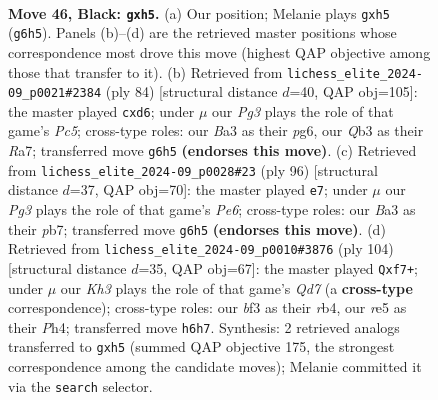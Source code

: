 \documentclass[11pt]{article}
\begin{document}
\clearpage

\begin{figure}[p]\centering
\begin{subfigure}{0.46\textwidth}\centering
\resizebox{\linewidth}{!}{%
\newchessgame
\chessboard[
  setfen={8/pp6/6pk/4R2P/5P2/bq3BK1/8/8 b - - 0 46},
  showmover=false,
  pgfstyle=straightmove, color=movearrow, markmove={g6-h5}
]}
\caption{}
\end{subfigure}\hfill
\begin{subfigure}{0.46\textwidth}\centering
\resizebox{\linewidth}{!}{%
\newchessgame
\chessboard[
  setfen={8/R3bk2/3pp1p1/2P3P1/7r/4Kp2/8/8 w - - 0 43},
  showmover=false,
  pgfstyle=straightmove, color=movearrow, markmove={c5-d6}
]}
\caption{}
\end{subfigure}
\\[4pt]
\begin{subfigure}{0.46\textwidth}\centering
\resizebox{\linewidth}{!}{%
\newchessgame
\chessboard[
  setfen={8/1pk2p1r/p1b1P3/8/5PP1/2Q3K1/1P6/8 w - - 0 49},
  showmover=false,
  pgfstyle=straightmove, color=movearrow, markmove={e6-e7}
]}
\caption{}
\end{subfigure}\hfill
\begin{subfigure}{0.46\textwidth}\centering
\resizebox{\linewidth}{!}{%
\newchessgame
\chessboard[
  setfen={8/1p1Q1pk1/4P1p1/8/1r3P1P/4K3/p7/8 w - - 0 53},
  showmover=false,
  pgfstyle=straightmove, color=movearrow, markmove={d7-f7}
]}
\caption{}
\end{subfigure}
\caption{\textbf{Move 46, Black: \texttt{gxh5}.} (a) Our position; Melanie plays \texttt{gxh5} (\texttt{g6h5}). Panels (b)--(d) are the retrieved master positions whose correspondence most drove this move (highest QAP objective among those that transfer to it). (b) Retrieved from \texttt{lichess\_elite\_2024-09\_p0021\#2384} (ply 84) [structural distance $d$=40, QAP obj=105]: the master played \texttt{cxd6}; under $\mu$ our \emph{Pg3} plays the role of that game's \emph{Pc5}; cross-type roles: our \emph{B}a3 as their \emph{p}g6, our \emph{Q}b3 as their \emph{R}a7; transferred move \texttt{g6h5} \textbf{(endorses this move)}. (c) Retrieved from \texttt{lichess\_elite\_2024-09\_p0028\#23} (ply 96) [structural distance $d$=37, QAP obj=70]: the master played \texttt{e7}; under $\mu$ our \emph{Pg3} plays the role of that game's \emph{Pe6}; cross-type roles: our \emph{B}a3 as their \emph{p}b7; transferred move \texttt{g6h5} \textbf{(endorses this move)}. (d) Retrieved from \texttt{lichess\_elite\_2024-09\_p0010\#3876} (ply 104) [structural distance $d$=35, QAP obj=67]: the master played \texttt{Qxf7+}; under $\mu$ our \emph{Kh3} plays the role of that game's \emph{Qd7} (a \textbf{cross-type} correspondence); cross-type roles: our \emph{b}f3 as their \emph{r}b4, our \emph{r}e5 as their \emph{P}h4; transferred move \texttt{h6h7}. Synthesis: 2 retrieved analogs transferred to \texttt{gxh5} (summed QAP objective 175, the strongest correspondence among the candidate moves); Melanie committed it via the \texttt{search} selector.}
\label{fig:thought-m91}
\end{figure}
\end{document}
